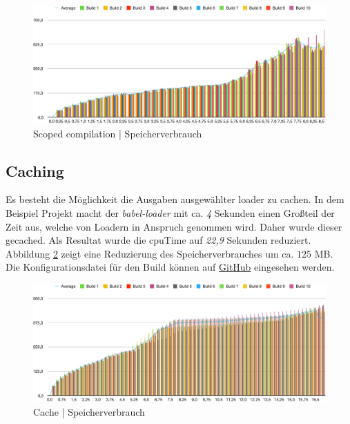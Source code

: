 \documentclass[11pt]{report}
\begin{document}
				\begin{figure}[p]
		            \includegraphics[width=\textwidth]{img/nondestr_scopedCompilation_memory}
		            \caption{Scoped compilation | Speicherverbrauch}
		            \label{figure:scopedCompilation_memory}
		        \end{figure}

    		\subsection{Caching}
    			Es besteht die Möglichkeit die Ausgaben ausgewählter \Gls{loader} zu cachen. In dem Beispiel Projekt macht der \emph{babel-loader} mit ca. \emph{4} Sekunden einen Großteil der Zeit aus, welche von Loadern in Anspruch genommen wird. Daher wurde dieser gecached. Als Resultat wurde die \Gls{cpuTime} auf \emph{22,9} Sekunden reduziert. Abbildung \ref{figure:cache_memory} zeigt eine Reduzierung des Speicherverbrauches um ca. $125$ MB.\\
    			Die Konfigurationsdatei für den Build können auf \href{INSERTLINKHERE}{GitHub} eingesehen werden.
    			
    			\begin{figure}[p]
		            \includegraphics[width=\textwidth]{img/nondestr_cache_memory}
		            \caption{Cache | Speicherverbrauch}
		            \label{figure:cache_memory}
		        \end{figure}
\end{document}
